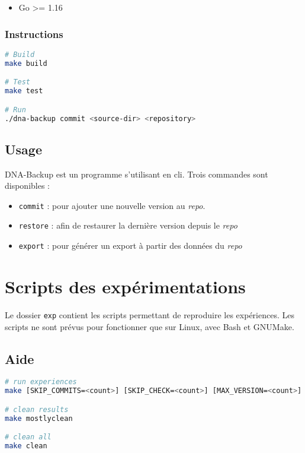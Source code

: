 \documentclass[a4paper]{report}
\begin{document}
\begin{itemize}
  \item Go >= 1.16
\end{itemize}

\subsubsection{Instructions}

\begin{lstlisting}[language=sh]
# Build
make build

# Test
make test

# Run
./dna-backup commit <source-dir> <repository>
\end{lstlisting}

\subsection{Usage}

DNA-Backup est un programme s'utilisant en \ac{cli}.
Trois commandes sont disponibles :

\begin{itemize}
  \item \verb|commit| : pour ajouter une nouvelle version au \emph{repo}.
  \item \verb|restore| : afin de restaurer la dernière version depuis le \emph{repo}
  \item \verb|export| : pour générer un export à partir des données du \emph{repo}
\end{itemize}

\section{Scripts des expérimentations}
\label{sec:experimentations}

Le dossier \verb|exp| contient les scripts permettant de reproduire les expériences.
Les scripts ne sont prévus pour fonctionner que sur Linux, avec Bash et GNUMake.

\subsection{Aide}


\begin{lstlisting}[language=sh]
# run experiences
make [SKIP_COMMITS=<count>] [SKIP_CHECK=<count>] [MAX_VERSION=<count>] [RANGE=<range>]

# clean results
make mostlyclean

# clean all
make clean
\end{lstlisting}
\end{document}
